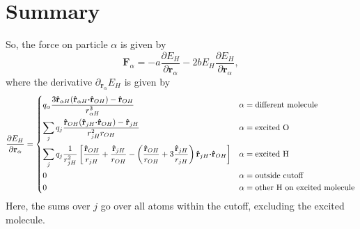 \documentclass{article}
\newcommand{\vect}[1]{\boldsymbol{\mathbf{#1}}}
\begin{document}
\section{Summary}
So, the force on particle $\alpha$ is given by 
\begin{equation}
\vect F_\alpha = -a\frac{\partial E_H}{\partial \vect r_\alpha} - 2bE_H\frac{\partial E_H}{\partial \vect r_\alpha} ,
\end{equation}
where the derivative $\partial_{ \vect r_\alpha} E_H$ is given by
\begin{equation*}
\frac{\partial E_H}{\partial \vect r_\alpha}  = \begin{dcases}
q_\alpha \frac{ 3\vect{\hat r}_{\alpha H}(\vect{\hat r}_{\alpha H}\vect\cdot\vect{\hat r}_{OH}) - \vect{\hat r}_{OH}}{r_{\alpha H}^3} &\alpha=\text{different molecule}\\
\sum_j q_j \frac{ \vect{\hat r}_{OH}(\vect{\hat r}_{jH}\vect\cdot\vect{\hat r}_{OH}) - \vect{\hat r}_{jH}}{r_{jH}^2r_{OH}} &\alpha=\text{excited O} \\
\sum_j q_j \frac{1}{r_{jH}^2} \left[\frac{\vect{\hat r}_{OH}}{r_{jH}} + \frac{\vect{\hat r}_{jH}}{r_{OH}} - \left(\frac{\vect{\hat r}_{OH}}{r_{OH}} +3\frac{\vect{\hat r}_{jH}}{r_{jH}}\right) \vect{\hat r}_{jH}\vect\cdot\vect{\hat r}_{OH} \right] &\alpha=\text{excited H} \\
0 &\alpha=\text{outside cutoff} \\
0 &\alpha=\text{other H on excited molecule}
\end{dcases}
\end{equation*}
Here, the sums over $j$ go over all atoms within the cutoff, excluding the excited molecule.
\end{document}
